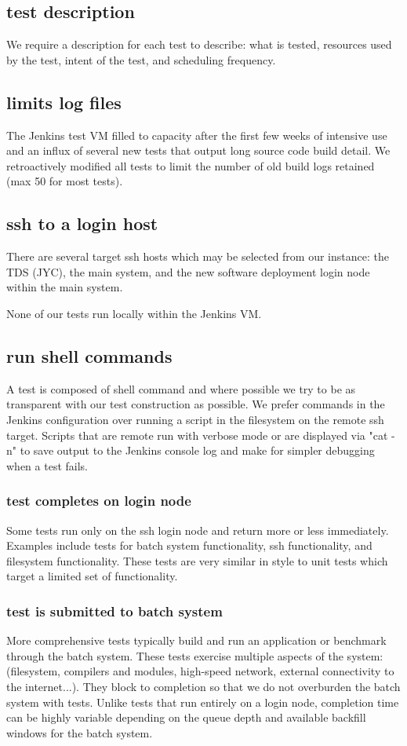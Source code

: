 \documentclass[10pt, conference, compsocconf]{IEEEtran}
\begin{document}
{\subsection{test description}
We require a description for each test to describe: what is tested, resources used by the test, intent of the test, and scheduling frequency.
\subsection{limits log files}
The Jenkins test VM filled to capacity after the first few weeks of intensive use and an influx of several new tests that output long source code build detail. 
 We retroactively modified all tests to limit the number of old build logs retained (max 50 for most tests). 

\subsection{ssh to a login host}
There are several target ssh hosts which may be selected from our instance: the TDS (JYC), the main system, and the new software deployment login node within the main system. 

 None of our tests run locally within the Jenkins VM.
\subsection{run shell commands}
A test is composed of shell command and where possible we try to be as transparent with our test construction as possible. 
We prefer commands in the Jenkins configuration over running a script in the filesystem on the remote ssh target. 
Scripts that are remote run with verbose mode or are displayed via "cat -n" to save output to the Jenkins console log and make for simpler debugging when a test fails.
\subsubsection{test completes on login node}
Some tests run only on the ssh login node and return more or less immediately. 
 Examples include tests for batch system functionality, ssh functionality, and filesystem functionality. 
 These tests are very similar in style to unit tests which target a limited set of functionality.
\subsubsection{test is submitted to batch system}
More comprehensive tests typically build and run an application or benchmark through the batch system. 
 These tests exercise multiple aspects of the system: (filesystem, compilers and modules, high-speed network, external connectivity to the internet...). 
 They block to completion so that we do not overburden the batch system with tests. 
 Unlike tests that run entirely on a login node, completion time can be highly variable depending on the queue depth and available backfill windows for the batch system.
}
\end{document}
